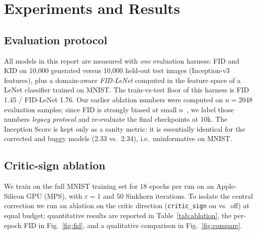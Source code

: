 \documentclass[10pt,twocolumn]{article}
\begin{document}
\section{Experiments and Results}

\subsection{Evaluation protocol}
\label{sec:protocol}
All models in this report are measured with \emph{one} evaluation harness: FID and KID on
10{,}000 generated versus 10{,}000 held-out test images (Inception-v3 features), plus a
domain-aware \emph{FID-LeNet} computed in the feature space of a LeNet classifier trained
on MNIST. The train-vs-test floor of this harness is FID 1.45 / FID-LeNet 1.76. Our
earlier ablation numbers were computed on $n=2048$ evaluation samples; since FID is
strongly biased at small $n$~\cite{chong2020}, we label those numbers \emph{legacy
protocol} and re-evaluate the final checkpoints at 10k. The Inception Score is kept only
as a sanity metric: it is essentially identical for the corrected and buggy models (2.33
vs.\ 2.34), i.e.\ uninformative on MNIST.

\subsection{Critic-sign ablation}
We train on the full MNIST training set for 18 epochs per run on an Apple-Silicon GPU (MPS),
with $\varepsilon=1$ and 50 Sinkhorn iterations. To isolate the central correction we run an
ablation on the critic direction (\texttt{critic\_sign} on vs.\ off) at equal budget;
quantitative results are reported in Table~\ref{tab:ablation}, the per-epoch FID in
Fig.~\ref{fig:fid}, and a qualitative comparison in Fig.~\ref{fig:compare}.

\begin{table}[h]
\centering
\footnotesize
\setlength{\tabcolsep}{3.5pt}
\caption{Critic-sign ablation on MNIST (18 epochs). The left column is the legacy protocol
($n_{\mathrm{eval}}=2048$, per-epoch); the right block re-evaluates the same final
checkpoints at 10k samples. Correcting the critic direction divides the FID by
$\approx 2.5$, consistently across all three feature spaces, while the IS does not move.}
\label{tab:ablation}
\end{table}
\end{document}
